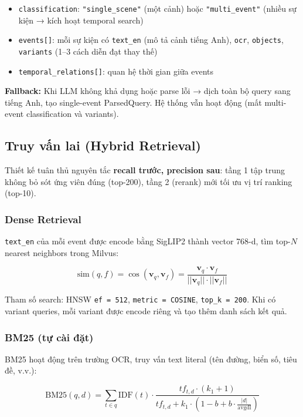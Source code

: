 \documentclass[12pt,a4paper,onecolumn]{article}
\begin{document}
\begin{itemize}
  \item \texttt{classification}: \texttt{"single\_scene"} (một cảnh) hoặc \texttt{"multi\_event"} (nhiều sự kiện → kích hoạt temporal search)
  \item \texttt{events[]}: mỗi sự kiện có \texttt{text\_en} (mô tả cảnh tiếng Anh), \texttt{ocr}, \texttt{objects}, \texttt{variants} (1–3 cách diễn đạt thay thế)
  \item \texttt{temporal\_relations[]}: quan hệ thời gian giữa events
\end{itemize}


\textbf{Fallback:} Khi LLM không khả dụng hoặc parse lỗi → dịch toàn bộ query sang tiếng Anh, tạo single-event ParsedQuery. Hệ thống vẫn hoạt động (mất multi-event classification và variants).

\subsection{Truy vấn lai (Hybrid Retrieval)}

Thiết kế tuân thủ nguyên tắc \textbf{recall trước, precision sau}: tầng 1 tập trung không bỏ sót ứng viên đúng (top-200), tầng 2 (rerank) mới tối ưu vị trí ranking (top-10).

\subsubsection{Dense Retrieval}

\texttt{text\_en} của mỗi event được encode bằng SigLIP2 thành vector 768-d, tìm top-$N$ nearest neighbors trong Milvus:

$$\text{sim}(q, f) = \cos(\mathbf{v}_q, \mathbf{v}_f) = \frac{\mathbf{v}_q \cdot \mathbf{v}_f}{||\mathbf{v}_q|| \cdot ||\mathbf{v}_f||}$$

Tham số search: HNSW \texttt{ef = 512}, \texttt{metric = COSINE}, \texttt{top\_k = 200}. Khi có variant queries, mỗi variant được encode riêng và tạo thêm danh sách kết quả.

\subsubsection{BM25 (tự cài đặt)}

BM25 hoạt động trên trường OCR, truy vấn text literal (tên đường, biển số, tiêu đề, v.v.):

$$\text{BM25}(q, d) = \sum_{t \in q} \text{IDF}(t) \cdot \frac{tf_{t,d} \cdot (k_1 + 1)}{tf_{t,d} + k_1 \cdot (1 - b + b \cdot \frac{|d|}{\text{avgdl}})}$$
\end{document}
